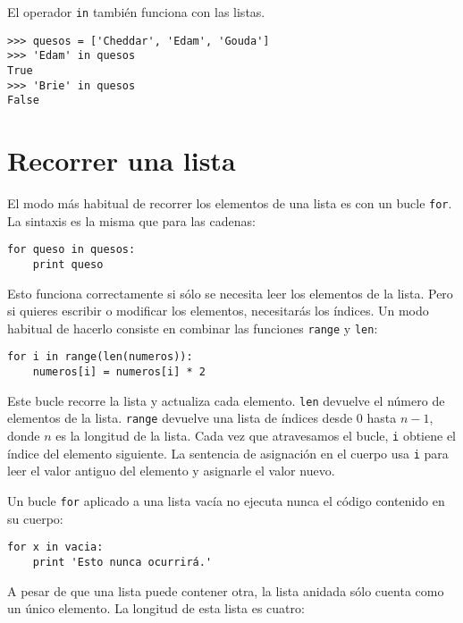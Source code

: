 


El operador {\tt in} también funciona con las listas.

\beforeverb
\begin{verbatim}
>>> quesos = ['Cheddar', 'Edam', 'Gouda']
>>> 'Edam' in quesos
True
>>> 'Brie' in quesos
False
\end{verbatim}
\afterverb


\section{Recorrer una lista}

El modo más habitual de recorrer los elementos de una lista es
con un bucle {\tt for}. La sintaxis es la misma que para las cadenas:

\beforeverb
\begin{verbatim}
for queso in quesos:
    print queso
\end{verbatim}
\afterverb
%
Esto funciona correctamente si sólo se necesita leer los elementos de la
lista. Pero si quieres escribir o modificar los elementos,
necesitarás los índices. Un modo habitual de hacerlo consiste en combinar
las funciones {\tt range} y {\tt len}:


\beforeverb
\begin{verbatim}
for i in range(len(numeros)):
    numeros[i] = numeros[i] * 2
\end{verbatim}
\afterverb
%
Este bucle recorre la lista y actualiza cada elemento. {\tt len}
devuelve el número de elementos de la lista. {\tt range} devuelve
una lista de índices desde 0 hasta $n-1$, donde $n$ es la longitud de
la lista. Cada vez que atravesamos el bucle, {\tt i} obtiene el índice
del elemento siguiente. La sentencia de asignación en el cuerpo usa
{\tt i} para leer el valor antiguo del elemento y asignarle el
valor nuevo.


Un bucle {\tt for} aplicado a una lista vacía no ejecuta nunca el código contenido en su cuerpo:

\beforeverb
\begin{verbatim}
for x in vacia:
    print 'Esto nunca ocurrirá.'
\end{verbatim}
\afterverb
%
A pesar de que una lista puede contener otra, la lista
anidada sólo cuenta como un único elemento. La longitud de esta lista
es cuatro:

